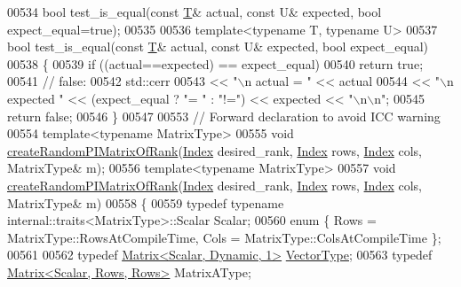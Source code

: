 \begin{DoxyCode}
00534 \textcolor{keywordtype}{bool} test\_is\_equal(\textcolor{keyword}{const} \hyperlink{group___sparse_core___module}{T}& actual, \textcolor{keyword}{const} U& expected, \textcolor{keywordtype}{bool} expect\_equal=\textcolor{keyword}{true});
00535 
00536 \textcolor{keyword}{template}<\textcolor{keyword}{typename} T, \textcolor{keyword}{typename} U>
00537 \textcolor{keywordtype}{bool} test\_is\_equal(\textcolor{keyword}{const} \hyperlink{group___sparse_core___module}{T}& actual, \textcolor{keyword}{const} U& expected, \textcolor{keywordtype}{bool} expect\_equal)
00538 \{
00539     \textcolor{keywordflow}{if} ((actual==expected) == expect\_equal)
00540         \textcolor{keywordflow}{return} \textcolor{keyword}{true};
00541     \textcolor{comment}{// false:}
00542     std::cerr
00543         << \textcolor{stringliteral}{"\(\backslash\)n    actual   = "} << actual
00544         << \textcolor{stringliteral}{"\(\backslash\)n    expected "} << (expect\_equal ? \textcolor{stringliteral}{"= "} : \textcolor{stringliteral}{"!="}) << expected << \textcolor{stringliteral}{"\(\backslash\)n\(\backslash\)n"};
00545     \textcolor{keywordflow}{return} \textcolor{keyword}{false};
00546 \}
00547 
00553 \textcolor{comment}{// Forward declaration to avoid ICC warning}
00554 \textcolor{keyword}{template}<\textcolor{keyword}{typename} MatrixType>
00555 \textcolor{keywordtype}{void} \hyperlink{namespace_eigen_a0d9a7ddcee5c7c8defaba3628455efb2}{createRandomPIMatrixOfRank}(\hyperlink{namespace_eigen_a62e77e0933482dafde8fe197d9a2cfde}{Index} desired\_rank, 
      \hyperlink{namespace_eigen_a62e77e0933482dafde8fe197d9a2cfde}{Index} rows, \hyperlink{namespace_eigen_a62e77e0933482dafde8fe197d9a2cfde}{Index} cols, MatrixType& m);
00556 \textcolor{keyword}{template}<\textcolor{keyword}{typename} MatrixType>
00557 \textcolor{keywordtype}{void} \hyperlink{namespace_eigen_a0d9a7ddcee5c7c8defaba3628455efb2}{createRandomPIMatrixOfRank}(\hyperlink{namespace_eigen_a62e77e0933482dafde8fe197d9a2cfde}{Index} desired\_rank, 
      \hyperlink{namespace_eigen_a62e77e0933482dafde8fe197d9a2cfde}{Index} rows, \hyperlink{namespace_eigen_a62e77e0933482dafde8fe197d9a2cfde}{Index} cols, MatrixType& m)
00558 \{
00559   \textcolor{keyword}{typedef} \textcolor{keyword}{typename} internal::traits<MatrixType>::Scalar Scalar;
00560   \textcolor{keyword}{enum} \{ Rows = MatrixType::RowsAtCompileTime, Cols = MatrixType::ColsAtCompileTime \};
00561 
00562   \textcolor{keyword}{typedef} \hyperlink{group___core___module}{Matrix<Scalar, Dynamic, 1>} \hyperlink{struct_vector_type}{VectorType};
00563   \textcolor{keyword}{typedef} \hyperlink{group___core___module_class_eigen_1_1_matrix}{Matrix<Scalar, Rows, Rows>} MatrixAType;

\end{DoxyCode}
